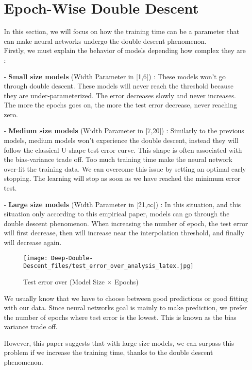 \documentclass[]{article}
\begin{document}
\section{Epoch-Wise Double Descent}

In this section, we will focus on how the training time can be a parameter that can make neural networks undergo the double descent phenomenon.
\\

Firstly, we must explain the behavior of models depending how complex they are :

- \textbf{Small size models} (Width Parameter in [1,6]) : These models won't go through double descent. These models will never reach the threshold because they are under-parameterized. The error decreases slowly and never increases. The more the epochs goes on, the more the test error decrease, never reaching zero.

- \textbf{Medium size models} (Width Parameter in [7,20]) : Similarly to the previous models, medium models won't experience the double descent, instead they will follow the classical U-shape test error curve. This shape is often associated with the bias-variance trade off. Too much training time make the neural network over-fit the training data. We can overcome this issue by setting an optimal early stopping. The learning will stop as soon as we have reached the minimum error test.

- \textbf{Large size models} (Width Parameter in [21,$\infty$]) : In this situation, and this situation only according to this empirical paper, models can go through the double descent phenomenon. When increasing the number of epoch, the test error will first decrease, then will increase near the interpolation threshold, and finally will decrease again.


\begin{figure}
  \centering
  \texttt{[image: Deep-Double-Descent\_files/test\_error\_over\_analysis\_latex.jpg]}
  \caption{Test error over (Model Size × Epochs)}
  \label{fig:test_over}
\end{figure}

We usually know that we have to choose between good predictions or good fitting with our data. Since neural networks goal is mainly to make prediction, we prefer the number of epochs where test error is the lowest. This is known as the bias variance trade off.

However, this paper suggests that with large size models, we can surpass this problem if we increase the training time, thanks to the double descent phenomenon.
\end{document}
